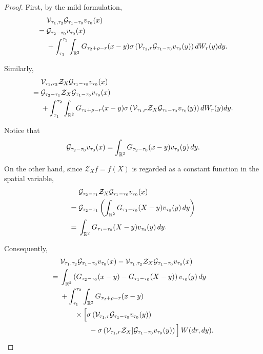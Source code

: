 \begin{proof}
First, by the mild formulation,
\begin{align*}
&\mathcal V_{\tau_1,\tau_2}
\mathcal{G}_{\tau_1-\tau_0}v_{\tau_0}(x)
\\
={}&
\mathcal{G}_{\tau_2-\tau_0}v_{\tau_0}(x)
\\
&+
\int_{\tau_1}^{\tau_2}
\int_{\mathbb R^2}
G_{\tau_2+\rho-r}(x-y)
\sigma\left(
\mathcal V_{\tau_1,r}
\mathcal{G}_{\tau_1-\tau_0}v_{\tau_0}(y)
\right)
dW_r(y)dy.
\end{align*}

Similarly,
\begin{align*}
&\mathcal V_{\tau_1,\tau_2}
\mathcal Z_X \mathcal{G}_{\tau_1-\tau_0}v_{\tau_0}(x)
\\
={}&
\mathcal{G}_{\tau_2-\tau_1}
\mathcal Z_X \mathcal{G}_{\tau_1-\tau_0}v_{\tau_0}(x)
\\
&+
\int_{\tau_1}^{\tau_2}
\int_{\mathbb R^2}
G_{\tau_2+\rho-r}(x-y)
\sigma\left(
\mathcal V_{\tau_1,r}
\mathcal Z_X \mathcal{G}_{\tau_1-\tau_0}v_{\tau_0}(y)
\right)
dW_r(y)dy.
\end{align*}

Notice that
\[
\mathcal{G}_{\tau_2-\tau_0}v_{\tau_0}(x)
=
\int_{\mathbb R^2}
G_{\tau_2-\tau_0}(x-y)
v_{\tau_0}(y)\,dy.
\]

On the other hand, since
$\mathcal Z_X f=f(X)$ is regarded as
a constant function in the spatial variable,
\begin{align*}
&\mathcal{G}_{\tau_2-\tau_1}
\mathcal Z_X \mathcal{G}_{\tau_1-\tau_0}v_{\tau_0}(x)
\\
={}&
\mathcal{G}_{\tau_2-\tau_1}
\left(
\int_{\mathbb R^2}
G_{\tau_1-\tau_0}(X-y)
v_{\tau_0}(y)\,dy
\right)
\\
={}&
\int_{\mathbb R^2}
G_{\tau_1-\tau_0}(X-y)
v_{\tau_0}(y)\,dy.
\end{align*}

Consequently,
\begin{align*}
&\mathcal V_{\tau_1,\tau_2}
\mathcal{G}_{\tau_1-\tau_0}v_{\tau_0}(x)
-
\mathcal V_{\tau_1,\tau_2}
\mathcal Z_X \mathcal{G}_{\tau_1-\tau_0}v_{\tau_0}(x)
\\
={}&
\int_{\mathbb R^2}
\left(
G_{\tau_2-\tau_0}(x-y)
-
G_{\tau_1-\tau_0}(X-y)
\right)
v_{\tau_0}(y)\,dy
\\
&+
\int_{\tau_1}^{\tau_2}
\int_{\mathbb R^2}
G_{\tau_2+\rho-r}(x-y)
\\
&\qquad\times
\Big[
\sigma\left(
\mathcal V_{\tau_1,r}
\mathcal{G}_{\tau_1-\tau_0}v_{\tau_0}(y)
\right)
\\
&\qquad\qquad-
\sigma\left(
\mathcal V_{\tau_1,r}
\mathcal Z_X ]\mathcal{G}_{\tau_1-\tau_0}v_{\tau_0}(y)
\right)
\Big]
\,W(dr,dy).
\end{align*}


\end{proof}
